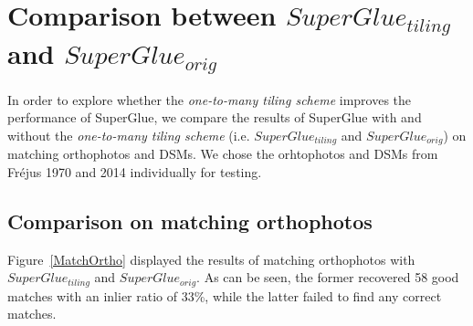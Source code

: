 
\chapter{Comparison between $SuperGlue_{tiling}$ and $SuperGlue_{orig}$}
\label{chap:appendix2}
In order to explore whether the \textit{one-to-many tiling scheme} improves the performance of SuperGlue, we compare the results of SuperGlue with and without the \textit{one-to-many tiling scheme} (i.e. $SuperGlue_{tiling}$ and $SuperGlue_{orig}$) on matching orthophotos and DSMs. We chose the orhtophotos and DSMs from Fr{\'e}jus 1970 and 2014 individually for testing.\\
\section{Comparison on matching orthophotos}
Figure~\ref{MatchOrtho} displayed the results of matching orthophotos with $SuperGlue_{tiling}$ and $SuperGlue_{orig}$. As can be seen, the former recovered 58 good matches with an inlier ratio of 33\%, while the latter failed to find any correct matches.\\
